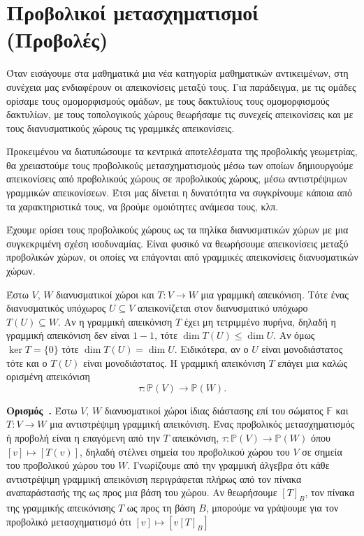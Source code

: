\documentclass[12pt, a4paper]{book}
\newcounter{definition}[section]
\newenvironment{definition}[1][]{\refstepcounter{definition}\par\medskip
   \textbf{Ορισμός~\thedefinition. #1} \rmfamily}{\medskip}
\begin{document}
\section{Προβολικοί μετασχηματισμοί (Προβολές)}

Όταν εισάγουμε στα μαθηματικά μια νέα κατηγορία μαθηματικών αντικειμένων, στη συνέχεια μας ενδιαφέρουν οι απεικονίσεις μεταξύ τους. Για παράδειγμα, με τις ομάδες ορίσαμε τους ομομορφισμούς ομάδων, με τους δακτυλίους τους ομομορφισμούς δακτυλίων, με τους τοπολογικούς χώρους θεωρήσαμε τις συνεχείς απεικονίσεις και με τους διανυσματικούς χώρους τις γραμμικές απεικονίσεις. 

Προκειμένου να διατυπώσουμε τα κεντρικά αποτελέσματα της προβολικής γεωμετρίας, θα χρειαστούμε τους προβολικούς μετασχηματισμούς μέσω των οποίων δημιουργούμε απεικονίσεις από προβολικούς χώρους σε προβολικούς χώρους, μέσω αντιστρέψιμων γραμμικών απεικονίσεων. Έτσι μας δίνεται η δυνατότητα να συγκρίνουμε κάποια από τα χαρακτηριστικά τους, να βρούμε ομοιότητες ανάμεσα τους, κλπ.

Έχουμε ορίσει τους προβολικούς χώρους ως τα πηλίκα διανυσματικών χώρων με μια συγκεκριμένη σχέση ισοδυναμίας. Είναι φυσικό να θεωρήσουμε απεικονίσεις μεταξύ προβολικών χώρων, οι οποίες να επάγονται από γραμμικές απεικονίσεις διανυσματικών χώρων.

Έστω $V,\, W$  διανυσματικοί χώροι και $T:V \rightarrow W$ μια γραμμική απεικόνιση. Τότε ένας διανυσματικός υπόχωρος $U \subseteq V$ απεικονίζεται στον διανυσματικό υπόχωρο $T(U) \subseteq W$. Αν η γραμμική απεικόνιση $T$ έχει μη τετριμμένο πυρήνα, δηλαδή η γραμμική απεικόνιση δεν είναι $1-1$, τότε  $\dim{T(U)} \leq \dim{U}$. Αν όμως $\ker{T} = \{0\}$ τότε $\dim{T(U)} = \dim{U}$. Ειδικότερα, αν ο $U$ είναι μονοδιάστατος τότε και ο $T(U)$ είναι μονοδιάστατος. Η γραμμική απεικόνιση $T$ επάγει μια καλώς ορισμένη απεικόνιση
\begin{displaymath}
τ: \mathbb{P}(V)\rightarrow \mathbb{P}(W).
\end{displaymath}

\begin{definition}
Έστω $V,\, W$  διανυσματικοί χώροι ίδιας διάστασης επί του σώματος $\mathbb{F}$ και $T:V \rightarrow W$ μια αντιστρέψιμη γραμμική απεικόνιση. Ένας προβολικός μετασχηματισμός ή προβολή είναι η επαγόμενη από την $T$ απεικόνιση, $τ: \mathbb{P}(V)\rightarrow \mathbb{P}(W)$ όπου $[v] \mapsto [T(v)]$, δηλαδή στέλνει σημεία του προβολικού χώρου του $V$ σε σημεία του προβολικού χώρου του $W$. Γνωρίζουμε από την γραμμική άλγεβρα ότι κάθε αντιστρέψιμη γραμμική απεικόνιση περιγράφεται πλήρως από τον πίνακα αναπαράστασής της ως προς μια βάση του χώρου. Αν θεωρήσουμε $[T]_B$, τον πίνακα της γραμμικής απεικόνισης $T$ ως προς τη βάση $Β$, μπορούμε να γράψουμε για τον προβολικό μετασχηματισμό ότι $[v] \mapsto [v[T]_B]$
\end{definition}
\end{document}
